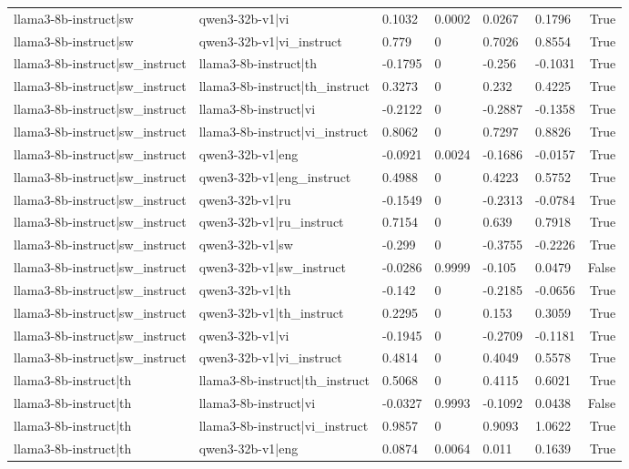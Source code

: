 \begin{table}
\begin{tabular}{llllllr}
llama3-8b-instruct|sw & qwen3-32b-v1|vi & 0.1032 & 0.0002 & 0.0267 & 0.1796 & True \\
llama3-8b-instruct|sw & qwen3-32b-v1|vi_instruct & 0.779 & 0 & 0.7026 & 0.8554 & True \\
llama3-8b-instruct|sw_instruct & llama3-8b-instruct|th & -0.1795 & 0 & -0.256 & -0.1031 & True \\
llama3-8b-instruct|sw_instruct & llama3-8b-instruct|th_instruct & 0.3273 & 0 & 0.232 & 0.4225 & True \\
llama3-8b-instruct|sw_instruct & llama3-8b-instruct|vi & -0.2122 & 0 & -0.2887 & -0.1358 & True \\
llama3-8b-instruct|sw_instruct & llama3-8b-instruct|vi_instruct & 0.8062 & 0 & 0.7297 & 0.8826 & True \\
llama3-8b-instruct|sw_instruct & qwen3-32b-v1|eng & -0.0921 & 0.0024 & -0.1686 & -0.0157 & True \\
llama3-8b-instruct|sw_instruct & qwen3-32b-v1|eng_instruct & 0.4988 & 0 & 0.4223 & 0.5752 & True \\
llama3-8b-instruct|sw_instruct & qwen3-32b-v1|ru & -0.1549 & 0 & -0.2313 & -0.0784 & True \\
llama3-8b-instruct|sw_instruct & qwen3-32b-v1|ru_instruct & 0.7154 & 0 & 0.639 & 0.7918 & True \\
llama3-8b-instruct|sw_instruct & qwen3-32b-v1|sw & -0.299 & 0 & -0.3755 & -0.2226 & True \\
llama3-8b-instruct|sw_instruct & qwen3-32b-v1|sw_instruct & -0.0286 & 0.9999 & -0.105 & 0.0479 & False \\
llama3-8b-instruct|sw_instruct & qwen3-32b-v1|th & -0.142 & 0 & -0.2185 & -0.0656 & True \\
llama3-8b-instruct|sw_instruct & qwen3-32b-v1|th_instruct & 0.2295 & 0 & 0.153 & 0.3059 & True \\
llama3-8b-instruct|sw_instruct & qwen3-32b-v1|vi & -0.1945 & 0 & -0.2709 & -0.1181 & True \\
llama3-8b-instruct|sw_instruct & qwen3-32b-v1|vi_instruct & 0.4814 & 0 & 0.4049 & 0.5578 & True \\
llama3-8b-instruct|th & llama3-8b-instruct|th_instruct & 0.5068 & 0 & 0.4115 & 0.6021 & True \\
llama3-8b-instruct|th & llama3-8b-instruct|vi & -0.0327 & 0.9993 & -0.1092 & 0.0438 & False \\
llama3-8b-instruct|th & llama3-8b-instruct|vi_instruct & 0.9857 & 0 & 0.9093 & 1.0622 & True \\
llama3-8b-instruct|th & qwen3-32b-v1|eng & 0.0874 & 0.0064 & 0.011 & 0.1639 & True \\

\end{tabular}
\end{table}
